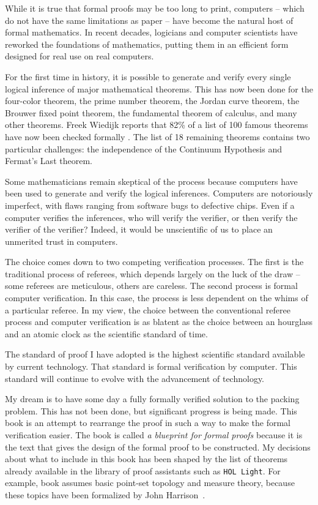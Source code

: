 While it is true that formal proofs may be too long to print,
computers -- which do not have the same limitations as paper -- have
become the natural host of formal mathematics. In recent decades,
logicians and computer scientists have reworked the foundations of
mathematics, putting them in an efficient form designed for real use
on real computers.

For the first time in history, it is possible to generate and verify
every single logical inference of major mathematical theorems.  This
has now been done for the four-color theorem, the prime number
theorem, the Jordan curve theorem, the Brouwer fixed point theorem,
the fundamental theorem of calculus, and many other theorems.  Freek
Wiedijk reports that 82\% of a list of 100 famous theorems have now
been checked formally \cite{wiedijk:100}.  The list of 18 remaining theorems contains two particular challenges: the independence of the Continuum Hypothesis and Fermat's Last theorem.

Some mathematicians remain skeptical of the process because
computers have been used to generate and verify the logical
inferences.  Computers are notoriously imperfect, with flaws ranging
from software bugs to defective chips.  Even if a computer verifies
the inferences, who will verify the verifier, or then verify the
verifier of the verifier?  
Indeed, it would be unscientific of us to
place an unmerited trust in computers.

The choice comes down to two competing verification processes.  The first is the traditional
process of referees, which depends largely on the luck of the draw
-- some referees are meticulous, others are careless.   The second
process is formal computer verification. In this case, the process
is less dependent on the whims of a particular referee.
In my view, the choice between the conventional referee process and
computer verification is as blatent as the choice between an
hourglass and an atomic clock as the scientific standard of time.

The standard of proof I have adopted is the highest scientific standard
available by current technology.  That 
standard is formal verification by computer.  This standard will
continue to evolve with the advancement of technology.

My dream is to have some day a fully formally verified solution to
the packing problem.
This has not been done, but significant progress is being
made.  This book is an attempt to rearrange the proof
in such a way to make the formal verification easier.  The book is called {\it a blueprint for formal proofs} because it is the text that gives the design of the formal proof to be constructed.  My decisions about what to include in this book has been shaped by the list of theorems already available in the library of proof assistants such as {\tt HOL Light}.  For example, book assumes basic point-set topology and measure theory, because these topics have been formalized by John Harrison~\cite{XX}.  

